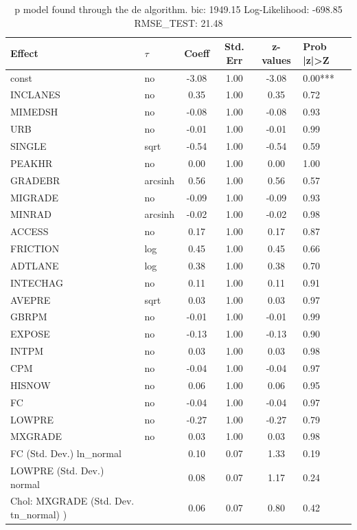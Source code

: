 \begin{table}
	\caption{p model found through the de algorithm. bic: 1949.15 Log-Likelihood: -698.85 RMSE_TEST: 21.48}
	\begin{center}
		\begin{tabular}{|l|l|c|c|c|l|}
			\hline
			Effect & $\tau$ & Coeff & Std. Err & z-values & Prob |z|>Z \\
			\hline
			const & no & -3.08 & 1.00 & -3.08 & 0.00*** \\
			\hline
			INCLANES & no & 0.35 & 1.00 & 0.35 & 0.72 \\
			\hline
			MIMEDSH & no & -0.08 & 1.00 & -0.08 & 0.93 \\
			\hline
			URB & no & -0.01 & 1.00 & -0.01 & 0.99 \\
			\hline
			SINGLE & sqrt & -0.54 & 1.00 & -0.54 & 0.59 \\
			\hline
			PEAKHR & no & 0.00 & 1.00 & 0.00 & 1.00 \\
			\hline
			GRADEBR & arcsinh & 0.56 & 1.00 & 0.56 & 0.57 \\
			\hline
			MIGRADE & no & -0.09 & 1.00 & -0.09 & 0.93 \\
			\hline
			MINRAD & arcsinh & -0.02 & 1.00 & -0.02 & 0.98 \\
			\hline
			ACCESS & no & 0.17 & 1.00 & 0.17 & 0.87 \\
			\hline
			FRICTION & log & 0.45 & 1.00 & 0.45 & 0.66 \\
			\hline
			ADTLANE & log & 0.38 & 1.00 & 0.38 & 0.70 \\
			\hline
			INTECHAG & no & 0.11 & 1.00 & 0.11 & 0.91 \\
			\hline
			AVEPRE & sqrt & 0.03 & 1.00 & 0.03 & 0.97 \\
			\hline
			GBRPM & no & -0.01 & 1.00 & -0.01 & 0.99 \\
			\hline
			EXPOSE & no & -0.13 & 1.00 & -0.13 & 0.90 \\
			\hline
			INTPM & no & 0.03 & 1.00 & 0.03 & 0.98 \\
			\hline
			CPM & no & -0.04 & 1.00 & -0.04 & 0.97 \\
			\hline
			HISNOW & no & 0.06 & 1.00 & 0.06 & 0.95 \\
			\hline
			FC & no & -0.04 & 1.00 & -0.04 & 0.97 \\
			\hline
			LOWPRE & no & -0.27 & 1.00 & -0.27 & 0.79 \\
			\hline
			MXGRADE & no & 0.03 & 1.00 & 0.03 & 0.98 \\
			\hline
			FC (Std. Dev.) ln_normal &  & 0.10 & 0.07 & 1.33 & 0.19 \\
			\hline
			LOWPRE (Std. Dev.) normal &  & 0.08 & 0.07 & 1.17 & 0.24 \\
			\hline
			 Chol: MXGRADE (Std. Dev. tn_normal) ) &  & 0.06 & 0.07 & 0.80 & 0.42 \\
			\hline
		\end{tabular}
	\end{center}
\end{table}